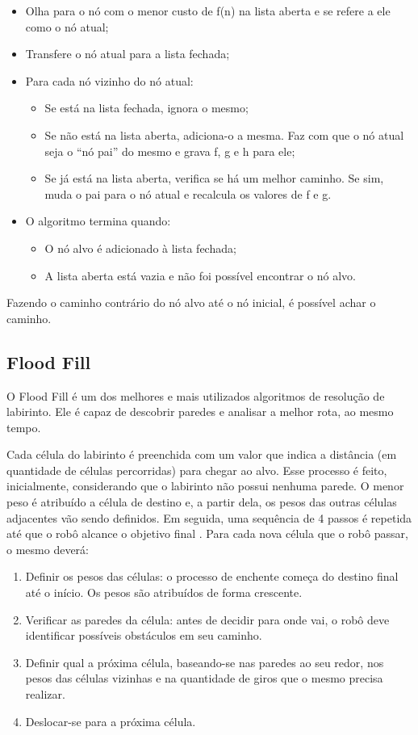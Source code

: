 \begin{itemize}
	\item Olha para o nó com o menor custo de f(n) na lista aberta e se refere a ele como o nó atual;
	\item Transfere o nó atual para a lista fechada;
	
	\item Para cada nó vizinho do nó atual:
	\begin{itemize}
		\item Se está na lista fechada, ignora o mesmo;
		\item Se não está na lista aberta, adiciona-o a mesma. Faz com que o nó atual seja o “nó pai” do mesmo e grava f, g e h para ele;
		\item Se já está na lista aberta, verifica se há um melhor caminho. Se sim, muda o pai para o nó atual e recalcula os valores de f e g.
	\end{itemize}
	
	\item O algoritmo termina quando:
	\begin{itemize}
		\item O nó alvo é adicionado à lista fechada;
		\item A lista aberta está vazia e não foi possível encontrar o nó alvo.
	\end{itemize}
\end{itemize}

Fazendo o caminho contrário do nó alvo até o nó inicial, é possível achar o caminho.

\subsection{Flood Fill}
\label{ssec:flood_fill}
O Flood Fill é um dos melhores e mais utilizados algoritmos de resolução de labirinto. Ele é capaz de descobrir paredes e analisar a melhor rota, ao mesmo tempo.

Cada célula do labirinto é preenchida com um valor que indica a distância (em quantidade de células percorridas) para chegar ao alvo. Esse processo é feito, inicialmente, considerando que o labirinto não possui nenhuma parede. O menor peso é atribuído a célula de destino e, a partir dela, os pesos das outras células adjacentes vão sendo definidos. Em seguida, uma sequência de 4 passos é repetida até que o robô alcance o objetivo final \cite{Jabbar2016}. Para cada nova célula que o robô passar, o mesmo deverá:

\begin{enumerate}
	\item Definir os pesos das células: o processo de enchente começa do destino final até o início. Os pesos são atribuídos de forma crescente.
	\item Verificar as paredes da célula: antes de decidir para onde vai, o robô deve identificar possíveis obstáculos em seu caminho.
	\item Definir qual a próxima célula, baseando-se nas paredes ao seu redor, nos pesos das células vizinhas e na quantidade de giros que o mesmo precisa realizar.
	\item Deslocar-se para a próxima célula.
\end{enumerate}

